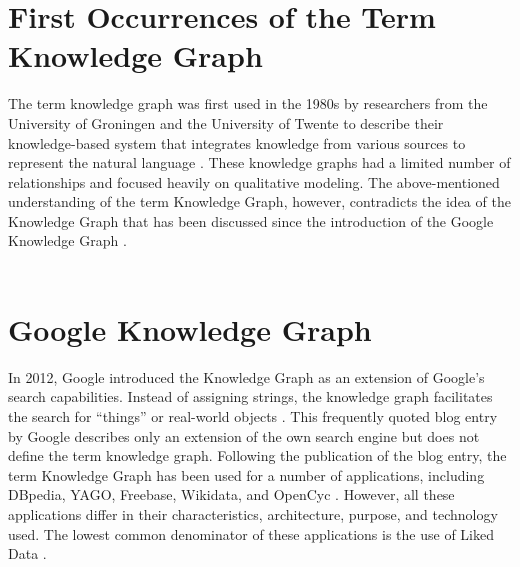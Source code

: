 ﻿\documentclass[11pt,titlepage,oneside,openany]{book}
\begin{document}
\section{First Occurrences of the Term Knowledge Graph} 
The term knowledge graph was first used in the 1980s by researchers from the University of Groningen and the University of Twente to describe their knowledge-based system that integrates knowledge from various sources to represent the natural language \cite{a4591467cd12418da0e44ac054c07cf8}. These knowledge graphs had a limited number of relationships and focused heavily on qualitative modeling. The above-mentioned understanding of the term Knowledge Graph, however, contradicts the idea of the Knowledge Graph that has been discussed since the introduction of the Google Knowledge Graph \cite{TDKG01}.
\\
\\

\section{Google Knowledge Graph} 
In 2012, Google introduced the Knowledge Graph as an extension of Google's search capabilities. Instead of assigning strings, the knowledge graph facilitates the search for ``things'' or real-world objects \cite{TDKG06}. This frequently quoted blog entry by Google \cite{TDKG06} describes only an extension of the own search engine but does not define the term knowledge graph. Following the publication of the blog entry, the term Knowledge Graph has been used for a number of applications, including DBpedia, YAGO, Freebase, Wikidata, and OpenCyc \cite{LDQ01}. However, all these applications differ in their characteristics, architecture, purpose, and technology used. The lowest common denominator of these applications is the use of Liked Data \cite{TDKG01}.
\\
\\ 
\end{document}
